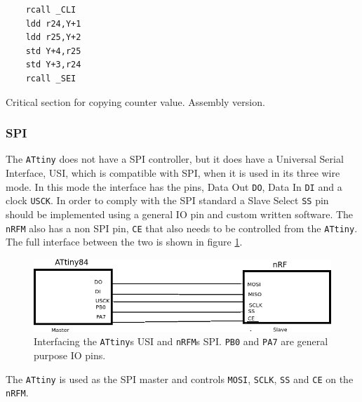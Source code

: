 {\renewcommand\fcolorbox[4][]{\textcolor{cyan}{\strut#4}}
\begin{listing}[h]
\begin{verbatim}
	rcall _CLI
	ldd r24,Y+1
	ldd r25,Y+2
	std Y+4,r25
	std Y+3,r24
	rcall _SEI
\end{verbatim}
\caption{Critical section for copying counter value. Assembly version.}
\label{code:critical_section_asm}
\end{listing}


\subsubsection{SPI} %
\label{ssub:spi}
The \texttt{ATtiny} does not have a SPI controller, but it does have a Universal Serial Interface, USI, which is compatible with SPI, when it is used in its three wire mode.
In this mode the interface has the pins, Data Out \texttt{DO}, Data In \texttt{DI} and a clock \texttt{USCK}.
In order to comply with the SPI standard a Slave Select \texttt{SS} pin should be implemented using a general IO pin and custom written software.
The \texttt{nRFM} also has a non SPI pin, \texttt{CE} that also needs to be controlled from the \texttt{ATtiny}.
The full interface between the two is shown in figure \ref{fig:tiny_nrf_com}.

\begin{figure}[h]
	\centering
	\includegraphics[width=.35\linewidth]{graphics/tiny_nrf_com}
	\caption[Interface between ATtiny84 and nRF24L01.]{Interfacing the \texttt{ATtiny}s USI and \texttt{nRFM}s SPI. \texttt{PB0} and \texttt{PA7} are general purpose IO pins.}
	\label{fig:tiny_nrf_com}
\end{figure}
The \texttt{ATtiny} is used as the SPI master and controls \texttt{MOSI}, \texttt{SCLK}, \texttt{SS} and \texttt{CE} on the \texttt{nRFM}.

}
